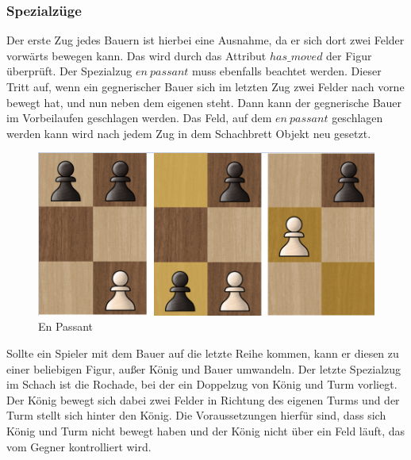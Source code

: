 \subsubsection{Spezialzüge}
Der erste Zug jedes Bauern ist hierbei eine Ausnahme, da er sich dort zwei Felder vorwärts bewegen kann. Das wird durch das Attribut \(has\_moved\) der Figur überprüft.
Der Spezialzug \(en~passant\) muss ebenfalls beachtet werden.
Dieser Tritt auf, wenn ein gegnerischer Bauer sich im letzten Zug zwei Felder nach vorne bewegt hat, und nun neben dem eigenen steht. Dann kann der gegnerische Bauer 
im Vorbeilaufen geschlagen werden. Das Feld, auf dem \(en~passant\) geschlagen werden kann wird nach jedem Zug in dem Schachbrett Objekt neu gesetzt.

\begin{figure}[H]
    \centering
    \includegraphics[scale=0.3]{images/en_passant.png}
    \caption{En Passant}
\end{figure}

Sollte ein Spieler mit dem Bauer auf die letzte Reihe kommen, kann er diesen zu einer beliebigen Figur, außer König und Bauer umwandeln.
Der letzte Spezialzug im Schach ist die Rochade, bei der ein Doppelzug von König und Turm vorliegt. Der König bewegt sich dabei zwei Felder in Richtung
des eigenen Turms und der Turm stellt sich hinter den König. Die Voraussetzungen hierfür sind, dass sich König und Turm nicht bewegt haben und der 
König nicht über ein Feld läuft, das vom Gegner kontrolliert wird. 

